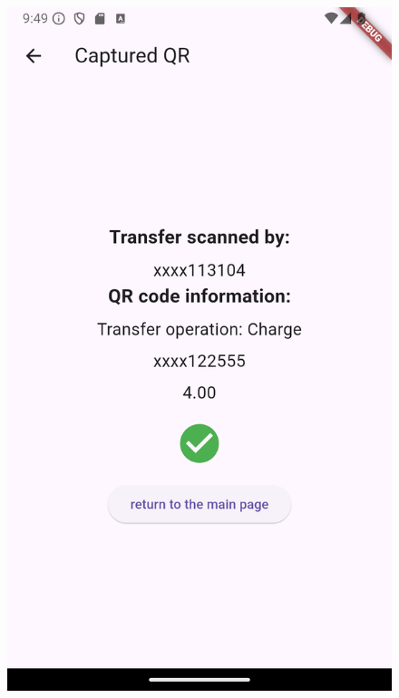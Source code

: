 \documentclass[a4paper,12pt,twoside]{ThesisStyle}
\begin{document}
\begin{figure}[h]
\begin{minipage}{0.31\textwidth}
        \includegraphics[width=\linewidth]{imatges/capturedQR.png}
    \end{minipage}
    \begin{minipage}{0.31\textwidth}

\end{minipage}
\end{figure}
\end{document}
